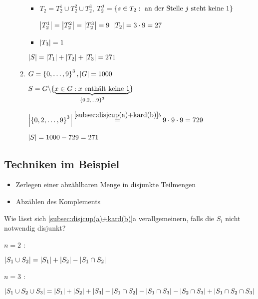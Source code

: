 \begin{enumerate}
\begin{enumerate}
\begin{itemize}
	    \item  $T_2 = T_2^1 \cup T_2^2 \cup T_2^3$, 
	    \; $T_2^j = \left\{s \in T_2 : \text{ an der Stelle } j \text{ steht keine 1}\right\}$
	    
	    $\left|T_2^1\right| = \left|T_2^2\right| = \left|T_2^3\right| = 9$
	    \quad $ \left|T_2\right| = 3 \cdot 9 = 27$
	    
	   \item  $\left|T_3\right| = 1$
	    
	    \end{itemize}
	    
	    $\left|S\right| = \left|T_1 \right| + \left|T_2\right| + \left|T_3\right| = 271$
	    
	    \item
	    $G = \left\{0, \dots, 9\right\}^3, \left|G\right| = 1000$
	    
	    $S = G \backslash \{\underbrace{x \in G : x \text{ enthält keine 1}}_{\left\{0, 2, \dots 9\right\}^3}\}$
	    
	    $\left|\left\{0, 2, \dots, 9\right\}^3\right| \stackrel{\ref{subsec:disjcup(a)+kard(b)}b}{=} 
	    9 \cdot 9 \cdot 9 = 729$
	    
	    $\left|S\right| = 1000 - 729 = 271$
	 		
	\end{enumerate}
	
\end{enumerate}

\subsection*{Techniken im Beispiel}
\begin{itemize}
	\item Zerlegen einer abzählbaren Menge in disjunkte Teilmengen
	\item Abzählen des Komplements
\end{itemize}

Wie lässt sich \ref{subsec:disjcup(a)+kard(b)}a 
verallgemeinern, falls die $S_i$ nicht notwendig disjunkt?

$n=2$ : 
$\left|S_1 \cup S_2\right| = \left|S_1\right| + \left|S_2\right| - \left|S_1 \cap S_2\right|$

$n=3$ : 
$\left|S_1 \cup S_2 \cup S_3\right| = \left|S_1\right| + \left|S_2\right| + \left|S_3\right|
                             - \left|S_1 \cap S_2\right| - \left|S_1 \cap S_3\right| - \left|S_2 \cap S_3\right|
                             + \left|S_1 \cap S_2 \cap S_3\right|$
                             
